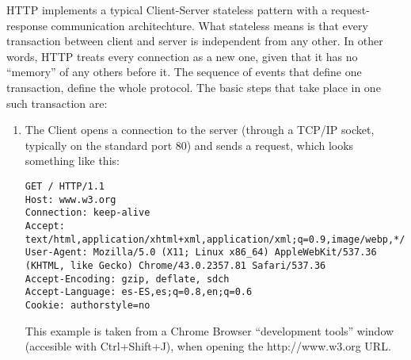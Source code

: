 HTTP implements a typical Client-Server stateless pattern with a request-response communication architechture. What stateless means is that every transaction between client and server is independent from any other. In other words, HTTP treats every connection as a new one, given that it has no ``memory'' of any others before it. The sequence of events that define one transaction, define the whole protocol. The basic steps that take place in one such transaction are:
\begin{enumerate}
\item The Client opens a connection to the server (through a TCP/IP socket, typically on the standard port 80) and sends a request, which looks something like this:
\begin{verbatim}
GET / HTTP/1.1
Host: www.w3.org
Connection: keep-alive
Accept: text/html,application/xhtml+xml,application/xml;q=0.9,image/webp,*/*;q=0.8
User-Agent: Mozilla/5.0 (X11; Linux x86_64) AppleWebKit/537.36 (KHTML, like Gecko) Chrome/43.0.2357.81 Safari/537.36
Accept-Encoding: gzip, deflate, sdch
Accept-Language: es-ES,es;q=0.8,en;q=0.6
Cookie: authorstyle=no
\end{verbatim}
This example is taken from a Chrome Browser ``development tools'' window (accesible with Ctrl+Shift+J), when opening the http://www.w3.org URL.\\


\end{enumerate}
